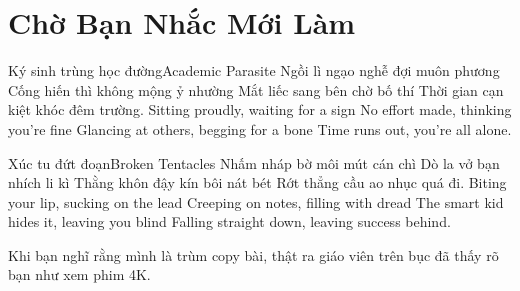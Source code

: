 \chapter{Chờ Bạn Nhắc Mới Làm}

\begin{tutuyetbox}{Ký sinh trùng học đường}{Academic Parasite}
Ngồi lì ngạo nghễ đợi muôn phương
Cống hiến thì không mộng ỷ nhường
Mắt liếc sang bên chờ bố thí
Thời gian cạn kiệt khóc đêm trường.
\tcblower
Sitting proudly, waiting for a sign 
No effort made, thinking you're fine 
Glancing at others, begging for a bone 
Time runs out, you're all alone.
\end{tutuyetbox}

\begin{tutuyetbox}{Xúc tu đứt đoạn}{Broken Tentacles}
Nhấm nháp bờ môi mút cán chì
Dò la vở bạn nhích li kì
Thằng khôn đậy kín bôi nát bét
Rớt thẳng cầu ao nhục quá đi.
\tcblower
Biting your lip, sucking on the lead 
Creeping on notes, filling with dread 
The smart kid hides it, leaving you blind 
Falling straight down, leaving success behind.
\end{tutuyetbox}

\begin{ghichu}
Khi bạn nghĩ rằng mình là trùm copy bài, thật ra giáo viên trên bục đã thấy rõ bạn như xem phim 4K.
\end{ghichu}